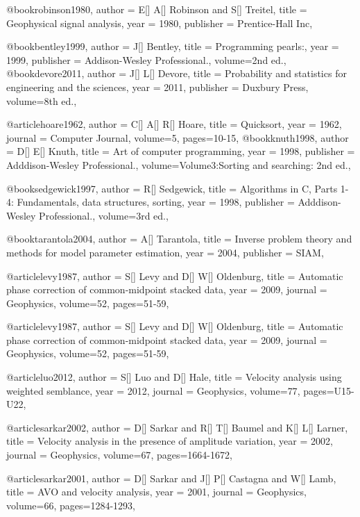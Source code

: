 {@book{robinson1980,
  author =	 {E[] A[] Robinson and S[] Treitel},
  title =	 {Geophysical signal analysis},
  year =	 1980,
  publisher =	 {Prentice-Hall Inc},
}

@book{bentley1999,
  author =	 {J[] Bentley},
  title =	 {Programming pearls:},
  year =	 1999,
  publisher =	 {Addison-Wesley Professional.},
  volume={2nd ed.},
}
@book{devore2011,
  author =	 {J[] L[] Devore},
  title =	 {Probability and statistics for engineering and the sciences},
  year =	 2011,
  publisher =	 {Duxbury Press},
  volume={8th ed.},
}

@article{hoare1962,
  author =	 {C[] A[] R[] Hoare},
  title =	 {Quicksort},
  year =	 1962,
  journal =	 {Computer Journal},
  volume={5},
 pages=10-15,
}
@book{knuth1998,
  author =	 {D[] E[] Knuth},
  title =	 {Art of computer programming},
  year =	 1998,
  publisher =	 { Adddison-Wesley Professional.},
  volume={Volume3:Sorting and searching: 2nd ed.},
}

@book{sedgewick1997,
  author =	 {R[] Sedgewick},
  title =	 {Algorithms in C, Parts 1-4: Fundamentals, data structures, sorting},
  year =	 1998,
  publisher =	 { Adddison-Wesley Professional.},
  volume={3rd ed.},
}

@book{tarantola2004,
  author =	 {A[] Tarantola},
  title =	 {Inverse problem theory and methods for model parameter estimation},
  year =	 2004,
  publisher =	 { SIAM},
}

@article{levy1987,
  author =	 {S[] Levy and D[] W[] Oldenburg},
  title =	 {Automatic phase correction of common-midpoint stacked data},
  year =	 2009,
  journal =	 {Geophysics},
  volume={52},
 pages=51-59,
}

@article{levy1987,
  author =	 {S[] Levy and D[] W[] Oldenburg},
  title =	 {Automatic phase correction of common-midpoint stacked data},
  year =	 2009,
  journal =	 {Geophysics},
  volume={52},
 pages=51-59,
}

@article{luo2012,
  author =	 {S[] Luo and D[] Hale},
  title =	 {Velocity analysis using weighted semblance},
  year =	 2012,
  journal =	 {Geophysics},
  volume={77},
 pages=U15-U22,
}

@article{sarkar2002,
  author =	 {D[] Sarkar and R[] T[] Baumel and K[] L[] Larner},
  title =	 {Velocity analysis in the presence of amplitude variation},
  year =	 2002,
  journal =	 {Geophysics},
  volume={67},
  pages=1664-1672,
}

@article{sarkar2001,
  author =	 {D[] Sarkar and J[] P[] Castagna and W[] Lamb},
  title =	 {AVO and velocity analysis},
  year =	 2001,
  journal =	 {Geophysics},
  volume={66},
 pages=1284-1293,
}

}
